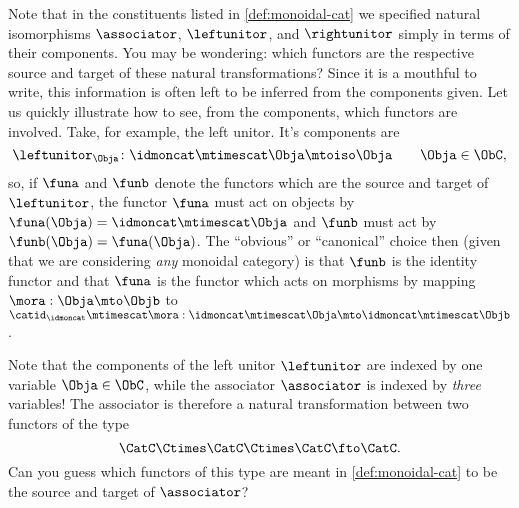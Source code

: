 \begin{remark}
    Note that in the constituents listed in \cref{def:monoidal-cat} we specified natural isomorphisms $\associator$, $\leftunitor$, and $\rightunitor$ simply in terms of their components.
    You may be wondering: which functors are the respective source and target of these natural transformations? Since it is a mouthful to write, this information is often left to be inferred from the components given.
    Let us quickly illustrate how to see, from the components, which functors are involved.
    Take, for example, the left unitor.
    It's components are
    \begin{equation*}
        \leftunitor_\Obja \colon \idmoncat\mtimescat \Obja \mtoiso \Obja \quad \quad \Obja\in \ObC,
    \end{equation*}
    so, if $\funa$ and $\funb$ denote the functors which are the source and target of $\leftunitor$, the functor $\funa$ must act on objects by $\funa(\Obja) = \idmoncat \mtimescat \Obja$ and $\funb$ must act by $\funb(\Obja) = \funa(\Obja)$.
    The ``obvious'' or ``canonical'' choice then (given that we are considering \emph{any} monoidal category) is that $\funb$ is the identity functor and that $\funa$ is the functor which acts on morphisms by mapping $\mora : \Obja \mto \Objb$ to $\catid_\idmoncat \mtimescat \mora:   \idmoncat\mtimescat \Obja \mto  \idmoncat\mtimescat \Objb$.
    
    Note that the components of the left unitor $\leftunitor$ are indexed by one variable $\Obja \in \ObC$, while the associator $\associator$ is indexed by \emph{three} variables! The associator is therefore a natural transformation between two functors of the type
    $$
    \CatC \Ctimes \CatC \Ctimes \CatC \fto \CatC.
    $$
    Can you guess which functors of this type are meant in \cref{def:monoidal-cat} to be the source and target of $\associator$?
\end{remark}


